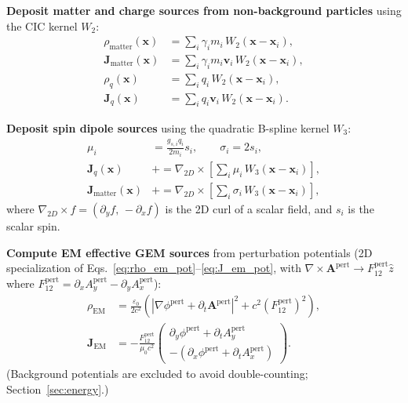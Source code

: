 \documentclass[11pt,a4paper]{article}
\newcommand{\vv}[1]{\mathbf{#1}}
\begin{document}
\begin{algsteps}
  \item \textbf{Deposit matter and charge sources from non-background particles} using the CIC kernel $W_2$:
  \begin{align}
    \rho_{\mathrm{matter}}(\vv{x}) &= \sum_i \gamma_i m_i\,W_2(\vv{x}-\vv{x}_i), \\
    \vv{J}_{\mathrm{matter}}(\vv{x}) &= \sum_i \gamma_i m_i\vv{v}_i\,W_2(\vv{x}-\vv{x}_i), \\
    \rho_q(\vv{x}) &= \sum_i q_i\,W_2(\vv{x}-\vv{x}_i), \\
    \vv{J}_q(\vv{x}) &= \sum_i q_i\vv{v}_i\,W_2(\vv{x}-\vv{x}_i).
  \end{align}

  \item \textbf{Deposit spin dipole sources} using the quadratic B-spline kernel $W_3$:
  \begin{align}
    \mu_i    &= \frac{g_{s,i} q_i}{2m_i} s_i, \qquad \sigma_i = 2 s_i, \\
    \vv{J}_q(\vv{x}) &\mathrel{+}= \nabla_{2D}\times\!\left[\sum_i \mu_i\,W_3(\vv{x}-\vv{x}_i)\right], \\
    \vv{J}_{\mathrm{matter}}(\vv{x}) &\mathrel{+}= \nabla_{2D}\times\!\left[\sum_i \sigma_i\,W_3(\vv{x}-\vv{x}_i)\right],
  \end{align}
  where $\nabla_{2D}\times f = (\partial_y f,\,-\partial_x f)$ is the 2D curl of a scalar field, and $s_i$ is the scalar spin.

  \item \textbf{Compute EM effective GEM sources} from perturbation potentials (2D specialization of Eqs.~\ref{eq:rho_em_pot}--\ref{eq:J_em_pot}, with $\nabla\times\vv{A}^{\mathrm{pert}} \to F_{12}^{\mathrm{pert}}\hat{z}$ where $F_{12}^{\mathrm{pert}} = \partial_x A_y^{\mathrm{pert}} - \partial_y A_x^{\mathrm{pert}}$):
  \begin{align}
    \rho_{\mathrm{EM}} &= \frac{\varepsilon_0}{2c^2}\!\left(|\nabla\phi^{\mathrm{pert}} + \partial_t\vv{A}^{\mathrm{pert}}|^2
      + c^2 (F_{12}^{\mathrm{pert}})^2\right), \\
    \vv{J}_{\mathrm{EM}} &= -\frac{F_{12}^{\mathrm{pert}}}{\mu_0 c^2}
      \begin{pmatrix} \partial_y\phi^{\mathrm{pert}} + \partial_t A_y^{\mathrm{pert}} \\ -(\partial_x\phi^{\mathrm{pert}} + \partial_t A_x^{\mathrm{pert}}) \end{pmatrix}.
  \end{align}
  (Background potentials are excluded to avoid double-counting; Section~\ref{sec:energy}.)


\end{algsteps}
\end{document}
